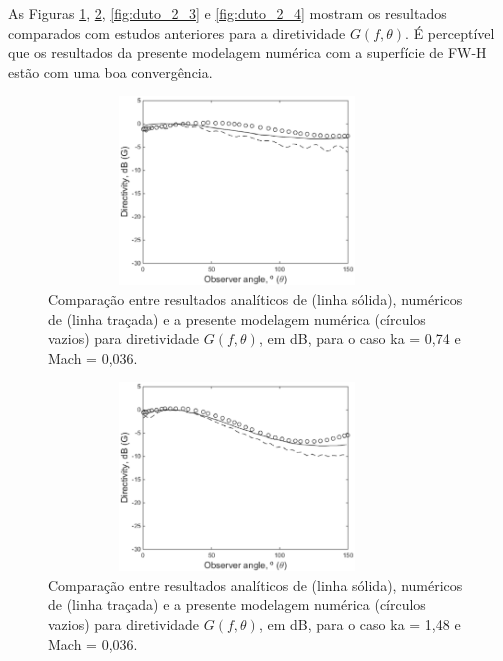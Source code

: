 \newpage
As Figuras \ref{fig:duto_2_1}, \ref{fig:duto_2_2}, \ref{fig:duto_2_3} e \ref{fig:duto_2_4} mostram os resultados comparados com estudos anteriores para a diretividade $G(f,\theta)$. É perceptível que os resultados da presente modelagem numérica com a superfície de FW-H estão com uma boa convergência.

\begin{figure}[ht!]
	\centering
	 \includegraphics[width=10cm, height=5cm]{figuras/ka_074_0036.eps}
	\caption{Comparação entre resultados analíticos de  (linha sólida), numéricos de  (linha traçada) e a presente modelagem numérica (círculos vazios) para diretividade $G(f,\theta)$, em dB, para o caso ka = 0,74 e Mach = 0,036.}
	\label{fig:duto_2_1}
\end{figure}

\begin{figure}[ht!]
	\centering
	 \includegraphics[width=10cm, height=5cm]{figuras/ka_148_0036.eps}
	\caption{Comparação entre resultados analíticos de  (linha sólida), numéricos de  (linha traçada) e a presente modelagem numérica (círculos vazios) para diretividade $G(f,\theta)$, em dB, para o caso ka = 1,48 e Mach = 0,036.}
	\label{fig:duto_2_2}
\end{figure}

